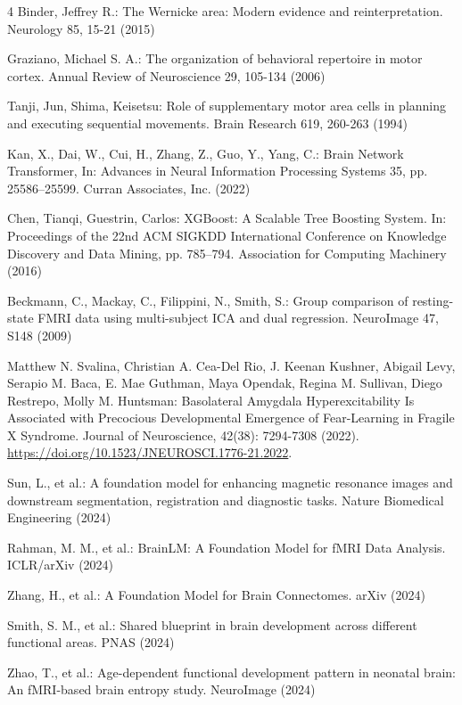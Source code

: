 \documentclass[runningheads,a4paper]{llncs}
\begin{document}
\begin{thebibliography}{4}
 Binder, Jeffrey R.: The Wernicke area: Modern evidence and reinterpretation. Neurology 85, 15-21 (2015)

 Graziano, Michael S. A.: The organization of behavioral repertoire in motor cortex. Annual Review of Neuroscience 29, 105-134 (2006)

 Tanji, Jun, Shima, Keisetsu: Role of supplementary motor area cells in planning and executing sequential movements. Brain Research 619, 260-263 (1994)

 Kan, X., Dai, W., Cui, H., Zhang, Z., Guo, Y., Yang, C.: Brain Network Transformer, In: Advances in Neural Information Processing Systems 35, pp. 25586--25599. Curran Associates, Inc. (2022)

 Chen, Tianqi, Guestrin, Carlos: XGBoost: A Scalable Tree Boosting System. In: Proceedings of the 22nd ACM SIGKDD International Conference on Knowledge Discovery and Data Mining, pp. 785–794. Association for Computing Machinery (2016)

 Beckmann, C., Mackay, C., Filippini, N., Smith, S.: Group comparison of resting-state FMRI data using multi-subject ICA and dual regression. NeuroImage 47, S148 (2009)

 Matthew N. Svalina, Christian A. Cea-Del Rio, J. Keenan Kushner, Abigail Levy, Serapio M. Baca, E. Mae Guthman, Maya Opendak, Regina M. Sullivan, Diego Restrepo, Molly M. Huntsman: Basolateral Amygdala Hyperexcitability Is Associated with Precocious Developmental Emergence of Fear-Learning in Fragile X Syndrome. Journal of Neuroscience, 42(38): 7294-7308 (2022). \url{https://doi.org/10.1523/JNEUROSCI.1776-21.2022}.

 Sun, L., et al.: A foundation model for enhancing magnetic resonance images and downstream segmentation, registration and diagnostic tasks. Nature Biomedical Engineering (2024)

 Rahman, M. M., et al.: BrainLM: A Foundation Model for fMRI Data Analysis. ICLR/arXiv (2024)

 Zhang, H., et al.: A Foundation Model for Brain Connectomes. arXiv (2024)

 Smith, S. M., et al.: Shared blueprint in brain development across different functional areas. PNAS (2024)

 Zhao, T., et al.: Age-dependent functional development pattern in neonatal brain: An fMRI-based brain entropy study. NeuroImage (2024)


\end{thebibliography}
\end{document}
